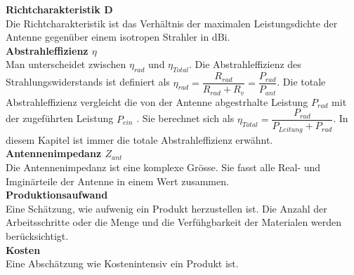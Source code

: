 \textbf{Richtcharakteristik D}\\
Die Richtcharakteristik ist das Verhältnis der maximalen Leistungsdichte der Antenne gegenüber einem isotropen Strahler in dBi.\\
\textbf{Abstrahleffizienz $\eta$}\\
Man unterscheidet zwischen $\eta_{rad}$ und $\eta_{Total}$. Die Abstrahleffizienz des Strahlungswiderstands ist definiert als $\eta_{rad}=\dfrac{R_{rad}}{R_{rad}+R_v}=\dfrac{P_{rad}}{P_{ant}}$. Die totale Abstrahleffizienz vergleicht die von der Antenne abgestrhalte Leistung $P_{rad}$ mit der zugeführten Leistung $P_{ein}$ . Sie berechnet sich als $\eta_{Total}=\dfrac{P_{rad}}{P_{Leitung}+P_{rad}}$. In diesem Kapitel ist immer die totale Abstrahleffizienz erwähnt.\\
\textbf{Antennenimpedanz $Z_{ant}$}\\
Die Antennenimpedanz ist eine komplexe Grösse. Sie fasst alle Real- und Imginärteile der Antenne in einem Wert zusammen.\\
\textbf{Produktionsaufwand}\\
Eine Schätzung, wie aufwenig ein Produkt herzustellen ist. Die Anzahl der Arbeitsschritte oder die Menge und die Verfühgbarkeit der Materialen werden berücksichtigt.\\
\textbf{Kosten}\\
Eine Abschätzung wie Kostenintensiv ein Produkt ist.
\newpage 
\thispagestyle{empty}

